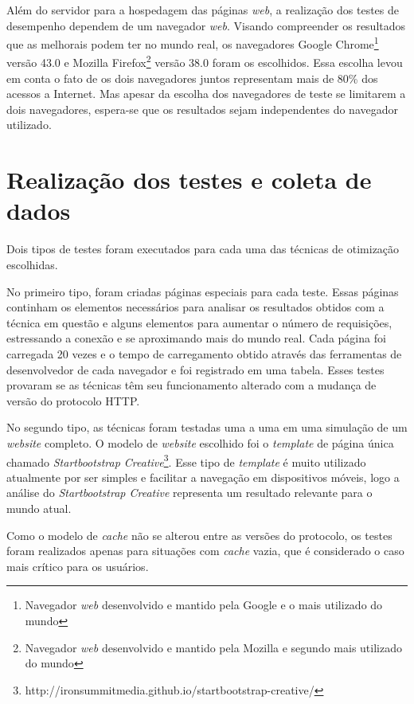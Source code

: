 Além do servidor para a hospedagem das páginas \textit{web}, a realização dos testes de desempenho dependem de um navegador \textit{web}. Visando compreender os resultados que as melhorais podem ter no mundo real, os navegadores Google Chrome\footnote{Navegador \textit{web} desenvolvido e mantido pela Google e o mais utilizado do mundo} versão 43.0 e Mozilla Firefox\footnote{Navegador \textit{web} desenvolvido e mantido pela Mozilla e segundo mais utilizado do mundo} versão 38.0 foram os escolhidos. Essa escolha levou em conta o fato de os dois navegadores juntos representam mais de 80\% dos acessos a Internet. Mas apesar da escolha dos navegadores de teste se limitarem a dois navegadores, espera-se que os resultados sejam independentes do navegador utilizado.

\section{Realização dos testes e coleta de dados}
\label{sec:realizacaodostestesecoletadedados}

Dois tipos de testes foram executados para cada uma das técnicas de otimização escolhidas.

No primeiro tipo, foram criadas páginas especiais para cada teste. Essas páginas continham os elementos necessários para analisar os resultados obtidos com a técnica em questão e alguns elementos para aumentar o número de requisições, estressando a conexão e se aproximando mais do mundo real. Cada página foi carregada 20 vezes e o tempo de carregamento obtido através das ferramentas de desenvolvedor de cada navegador e foi registrado em uma tabela. Esses testes provaram se as técnicas têm seu funcionamento alterado com a mudança de versão do protocolo HTTP.

No segundo tipo, as técnicas foram testadas uma a uma em uma simulação de um \textit{website} completo. O modelo de \textit{website} escolhido foi o \textit{template} de página única chamado \textit{Startbootstrap Creative}\footnote{http://ironsummitmedia.github.io/startbootstrap-creative/}. Esse tipo de \textit{template} é muito utilizado atualmente por ser simples e facilitar a navegação em dispositivos móveis, logo a análise do \textit{Startbootstrap Creative} representa um resultado relevante para o mundo atual.

Como o modelo de \textit{cache} não se alterou entre as versões do protocolo, os testes foram realizados apenas para situações com \textit{cache} vazia, que é considerado o caso mais crítico para os usuários.

